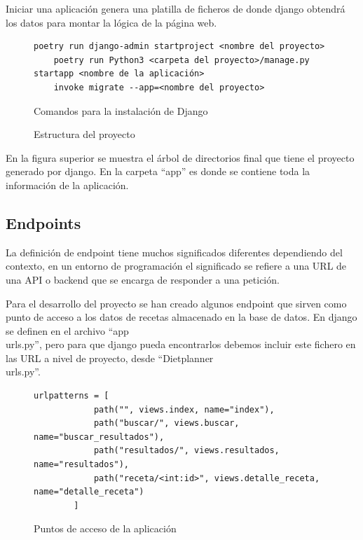 Iniciar una aplicación genera una platilla de ficheros de donde \gls{django} obtendrá los datos para montar la lógica de la página web. 
\begin{figure}[h!]
\begin{lstlisting}[style=consola]
    poetry run django-admin startproject <nombre del proyecto>
    poetry run Python3 <carpeta del proyecto>/manage.py startapp <nombre de la aplicación>
    invoke migrate --app=<nombre del proyecto>
\end{lstlisting}
\caption{Comandos para la instalación de Django}
\end{figure}

\newpage
\begin{figure}[h!]
    \caption{Estructura del proyecto}
    \label{fig:django}
\end{figure}
En la figura superior se muestra el árbol de directorios final que tiene el proyecto generado por \gls{django}. En la carpeta ``app'' es donde se contiene toda la información de la aplicación. 

\subsection{Endpoints}
La definición de \gls{endpoint} tiene muchos significados diferentes dependiendo del contexto, en un entorno de programación el significado se refiere a una URL de una \gls{API} o \gls{backend} que se encarga de responder a una petición. 

Para el desarrollo del proyecto se han creado algunos \gls{endpoint} que sirven como punto de acceso a los datos de recetas almacenado en la base de datos. En \gls{django} se definen en el archivo ``app\\urls.py'', pero para que \gls{django} pueda encontrarlos debemos incluir este fichero en las URL a nivel de proyecto, desde ``Dietplanner\\urls.py''. 

\begin{figure}
    \centering
    \begin{lstlisting}[style=consola]
        urlpatterns = [
            path("", views.index, name="index"),
            path("buscar/", views.buscar, name="buscar_resultados"),
            path("resultados/", views.resultados, name="resultados"),
            path("receta/<int:id>", views.detalle_receta, name="detalle_receta")
        ]
    \end{lstlisting}
    \caption{Puntos de acceso de la aplicación}
    \label{sni:endpoints}
\end{figure}

